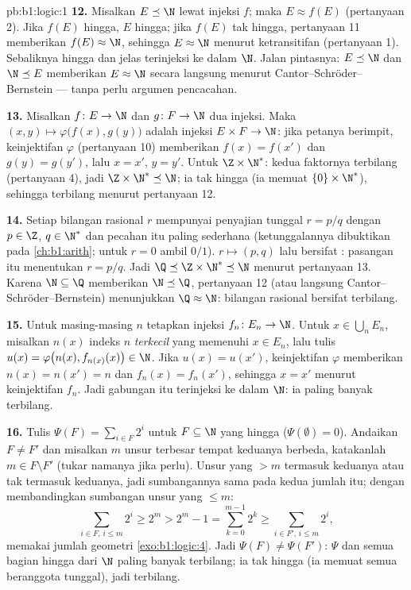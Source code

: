 \begin{solution}{pb:b1:logic:1}
\textbf{12.} Misalkan $E \preceq \N$ lewat injeksi $f$; maka $E \approx
f(E)$ (pertanyaan 2). Jika $f(E)$ hingga, $E$ hingga; jika $f(E)$
tak hingga, pertanyaan 11 memberikan $f(E) \approx \N$, sehingga $E \approx \N$ menurut
ketransitifan (pertanyaan 1). Sebaliknya  hingga dan 
jelas terinjeksi ke dalam $\N$. Jalan pintasnya: $E \preceq \N$ dan $\N
\preceq E$ memberikan $E \approx \N$ secara langsung menurut
Cantor--Schröder--Bernstein --- tanpa perlu argumen pencacahan.

\textbf{13.} Misalkan $f \colon E \to \N$ dan $g \colon F \to \N$ dua
injeksi. Maka $(x, y) \mapsto \varphi\bigl(f(x), g(y)\bigr)$ adalah
injeksi $E \times F \to \N$: jika petanya berimpit, keinjektifan
$\varphi$ (pertanyaan 10) memberikan $f(x) = f(x')$ dan $g(y) = g(y')$,
lalu $x = x'$, $y = y'$. Untuk $\Z \times \N^*$: kedua faktornya
terbilang (pertanyaan 4), jadi $\Z \times \N^* \preceq \N$; ia
tak hingga (ia memuat $\{0\} \times \N^*$), sehingga terbilang menurut
pertanyaan 12.

\textbf{14.} Setiap bilangan rasional $r$ mempunyai penyajian tunggal $r =
p/q$ dengan $p \in \Z$, $q \in \N^*$ dan pecahan itu paling sederhana
(ketunggalannya dibuktikan pada \cref{ch:b1:arith}; untuk $r = 0$ ambil
$0/1$).  $r \mapsto (p, q)$ lalu bersifat : pasangan itu
menentukan $r = p/q$. Jadi $\Q \preceq \Z \times \N^* \preceq \N$
menurut pertanyaan 13. Karena $\N \subseteq \Q$ memberikan $\N \preceq \Q$,
pertanyaan 12 (atau langsung Cantor--Schröder--Bernstein) menunjukkan $\Q
\approx \N$: bilangan rasional bersifat terbilang.

\textbf{15.} Untuk masing-masing $n$ tetapkan injeksi $f_n \colon E_n \to \N$.
Untuk $x \in \bigcup_n E_n$, misalkan $n(x)$ indeks $n$ \emph{terkecil} yang memenuhi
$x \in E_n$, lalu tulis $u(x) = \varphi\bigl(n(x), f_{n(x)}(x)\bigr)
\in \N$. Jika $u(x) = u(x')$, keinjektifan $\varphi$ memberikan $n(x) =
n(x') = n$ dan $f_n(x) = f_n(x')$, sehingga $x = x'$ menurut keinjektifan
$f_n$. Jadi gabungan itu terinjeksi ke dalam $\N$: ia paling banyak terbilang.

\textbf{16.} Tulis $\Psi(F) = \sum_{i \in F} 2^i$ untuk $F \subseteq \N$
yang hingga ($\Psi(\emptyset) = 0$). Andaikan $F \neq F'$ dan misalkan $m$
unsur terbesar tempat keduanya berbeda, katakanlah $m \in F \setminus
F'$ (tukar namanya jika perlu). Unsur yang $> m$ termasuk keduanya atau
tak termasuk keduanya, jadi sumbangannya sama pada kedua jumlah itu;
dengan membandingkan sumbangan unsur yang $\leq m$:
\[
\sum_{i \in F,\, i \leq m} 2^i \geq 2^m
> 2^m - 1 = \sum_{k=0}^{m-1} 2^k
\geq \sum_{i \in F',\, i \leq m} 2^i ,
\]
memakai jumlah geometri \cref{exo:b1:logic:4}. Jadi $\Psi(F)
\neq \Psi(F')$: $\Psi$  dan  semua  bagian hingga
dari $\N$ paling banyak terbilang; ia tak hingga (ia memuat semua
 beranggota tunggal), jadi terbilang.


\end{solution}
